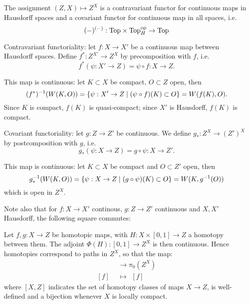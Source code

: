 \begin{remark}
The assignment $(Z,X)\mapsto Z^X$ is a contravariant functor for continuous maps in Hausdorff spaces and a covariant functor for continuous map in all spaces, i.e.
\[(-)^{(-)}:{\mathrm{Top}}\times{\mathrm{Top}}^{\operatorname{op}}_{H}\to {\mathrm{Top}}\]


Contravariant functoriality: let $f:X\to X'$ be a continuous map between Hausdorff spaces. Define $f^*:Z^{X'}\to Z^X$ by precomposition with $f$, i.e.
\[f^*(\psi:X'\to Z)=\psi\circ f:X\to Z.\]

This map is continuous: let $K\subset X$ be compact, $O\subset Z$ open, then
\[(f^*)^{-1}(W(K,O))=\{\psi:X'\to Z\mid (\psi\circ f)(K)\subset O\}=W(f(K),O).\]
Since $K$ is compact, $f(K)$ is quasi-compact; since $X'$ is Hausdorff, $f(K)$ is compact.

Covariant functoriality: let $g:Z\to Z'$ be continuous. We define $g_*:Z^X\to (Z')^X$ by postcomposition with $g$, i.e.
\[g_*(\psi:X\to Z)=g\circ\psi:X\to Z'.\]

This map is continuous: let $K\subset X$ be compact and $O\subset Z'$ open, then
\[g_*^{-1}(W(K,O))=\{\psi:X\to Z\mid (g\circ\psi)(K)\subset O\}=W(K,g^{-1}(O))\]
which is open in $Z^X$.

Note also that for $f:X\to X'$ continous, $g:Z\to Z'$ continuous and $X,X'$ Hausdorff, the following square commutes:
\begin{center}
\end{center}
\end{remark}

\begin{example}
Let $f,g:X\to Z$ be homotopic maps, with $H:X\times[0,1]\to Z$ a homotopy between them. The adjoint $\Phi(H):[0,1]\to Z^X$ is then continuous. Hence homotopies correspond to paths in $Z^X$, so that the map:
\begin{align*}
[X,Z]&\to\pi_0(Z^X)\\
[f]\ \ &\mapsto\ \ [f]
\end{align*}
where $[X,Z]$ indicates the set of homotopy classes of maps $X\to Z$, is well-defined and a bijection whenever $X$ is locally compact.
\end{example}


